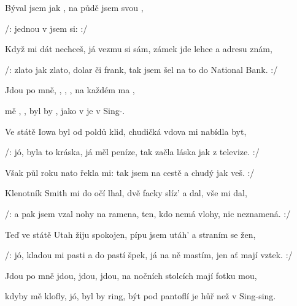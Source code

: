 

\zs
Býval jsem  jak  ,
na půdě  jsem  svou ,

/:  jednou v   jsem si:  :/
\ks

\zs
Když mi dát nechceš, já vezmu si sám,
zámek jde lehce a adresu znám,

/: zlato jak zlato, dolar či frank,
tak jsem šel na to do National Bank. :/
\ks

\zr
Jdou po mně, , , ,
na každém  ma ,

 mě , , byl by ,
 jako v  je v  Sing-.     
\kr

\zs
Ve státě Iowa byl od poldů klid,
chudičká vdova mi nabídla byt,

/: jó, byla to kráska, já měl peníze,
tak začla láska jak z televize. :/
\ks

\zs
Však půl roku nato řekla mi: 
tak jsem na cestě a chudý jak veš. :/
\ks

\zr  \kr

\zs
Klenotník Smith mi do očí lhal,
dvě facky slíz' a dal, vše mi dal,

/: a pak jsem vzal nohy na ramena,
ten, kdo nemá vlohy, nic neznamená. :/
\ks

\zs
Teď ve státě Utah žiju spokojen,
pípu jsem utáh' a straním se žen,

/: jó, kladou mi pasti a do pastí špek,
já na ně mastím, jen ať mají vztek. :/
\ks

\zr
Jdou po mně jdou, jdou, jdou,
na nočních stolcích mají fotku mou,

kdyby mě klofly, jó, byl by ring,
být pod pantoflí je hůř než v Sing-sing.
\kr

\kp





